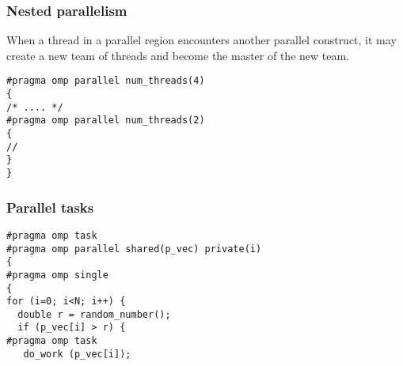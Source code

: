\documentclass{beamer}
\begin{document}
\begin{frame}
\frametitle{Nested parallelism}

\begin{block}{}
When a thread in a parallel region encounters another parallel construct, it
may create a new team of threads and become the master of the new
team.









\begin{verbatim}
#pragma omp parallel num_threads(4)
{
/* .... */
#pragma omp parallel num_threads(2)
{
//  
}
}

\end{verbatim}

\end{block}
\end{frame}

\begin{frame}
\frametitle{Parallel tasks}

\begin{block}{}











\begin{verbatim}
#pragma omp task 
#pragma omp parallel shared(p_vec) private(i)
{
#pragma omp single
{
for (i=0; i<N; i++) {
  double r = random_number();
  if (p_vec[i] > r) {
#pragma omp task
   do_work (p_vec[i]);

\end{verbatim}


\end{block}
\end{frame}
\end{document}
